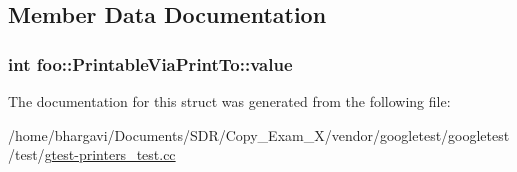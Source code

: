 \subsection{Member Data Documentation}
\subsubsection[{\texorpdfstring{value}{value}}]{\setlength{\rightskip}{0pt plus 5cm}int foo\+::\+Printable\+Via\+Print\+To\+::value}\hypertarget{structfoo_1_1_printable_via_print_to_a16f8c6420275d86f0d0112ca5a41bca2}{}\label{structfoo_1_1_printable_via_print_to_a16f8c6420275d86f0d0112ca5a41bca2}


The documentation for this struct was generated from the following file\+:\begin{DoxyCompactItemize}
\item 
/home/bhargavi/\+Documents/\+S\+D\+R/\+Copy\+\_\+\+Exam\+\_\+X/vendor/googletest/googletest/test/\hyperlink{gtest-printers__test_8cc}{gtest-\/printers\+\_\+test.\+cc}\end{DoxyCompactItemize}
